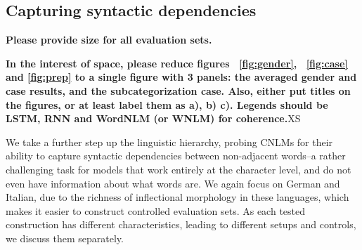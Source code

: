 \subsection{Capturing syntactic dependencies}
\label{sec:dependencies}

\textbf{Please provide size for all evaluation sets.}

\textbf{In the interest of space, please reduce figures ~\ref{fig:gender}, ~\ref{fig:case} and \ref{fig:prep} to a single figure with 3 panels: the averaged gender and case results, and the subcategorization case. Also, either put titles on the figures, or at least label them as a), b) c). Legends should be LSTM, RNN and WordNLM (or WNLM) for coherence.}XS

We take a further step up the linguistic hierarchy, probing CNLMs for their ability to capture syntactic dependencies between non-adjacent words--a rather challenging task for models that work entirely at the character level, and do not even have information about what words are. We again focus on German and Italian, due to the richness of inflectional morphology in these languages, which makes it easier to construct controlled evaluation sets. As each tested construction has different characteristics, leading to different setups and controls, we discuss them separately. 





